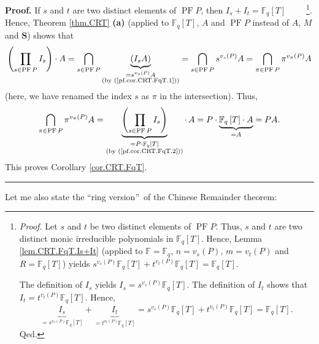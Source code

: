 \documentclass[numbers=enddot,12pt,final,onecolumn,notitlepage]{scrartcl}%
\theoremstyle{definition}
\newenvironment{proof}[1][Proof]{\noindent\textbf{#1.} }{\ \rule{0.5em}{0.5em}}
\let\prodnonlimits\prod
\renewcommand{\prod}{\prodnonlimits\limits}
\begin{document}
\begin{proof}
If $s$ and $t$ are two distinct elements of $\operatorname*{PF}P$, then
$I_{s}+I_{t}=\mathbb{F}_{q}\left[  T\right]  $%
\ \ \ \ \footnote{\textit{Proof.} Let $s$ and $t$ be two distinct elements of
$\operatorname*{PF}P$. Thus, $s$ and $t$ are two distinct monic irreducible
polynomials in $\mathbb{F}_{q}\left[  T\right]  $. Hence, Lemma
\ref{lem.CRT.FqT.Is+It} (applied to $\mathbb{F}=\mathbb{F}_{q}$,
$n=v_{s}\left(  P\right)  $, $m=v_{t}\left(  P\right)  $ and $R=\mathbb{F}%
_{q}\left[  T\right]  $) yields $s^{v_{s}\left(  P\right)  }\mathbb{F}%
_{q}\left[  T\right]  +t^{v_{t}\left(  P\right)  }\mathbb{F}_{q}\left[
T\right]  =\mathbb{F}_{q}\left[  T\right]  $.
\par
The definition of $I_{s}$ yields $I_{s}=s^{v_{s}\left(  P\right)  }%
\mathbb{F}_{q}\left[  T\right]  $. The definition of $I_{t}$ shows that
$I_{t}=t^{v_{t}\left(  P\right)  }\mathbb{F}_{q}\left[  T\right]  $. Hence,%
\[
\underbrace{I_{s}}_{=s^{v_{s}\left(  P\right)  }\mathbb{F}_{q}\left[
T\right]  }+\underbrace{I_{t}}_{=t^{v_{t}\left(  P\right)  }\mathbb{F}%
_{q}\left[  T\right]  }=s^{v_{s}\left(  P\right)  }\mathbb{F}_{q}\left[
T\right]  +t^{v_{t}\left(  P\right)  }\mathbb{F}_{q}\left[  T\right]
=\mathbb{F}_{q}\left[  T\right]  .
\]
Qed.}. Hence, Theorem \ref{thm.CRT} \textbf{(a)} (applied to $\mathbb{F}%
_{q}\left[  T\right]  $, $A$ and $\operatorname*{PF}P$ instead of $A$, $M$ and
$\mathbf{S}$) shows that%
\[
\left(  \prod\limits_{s\in\operatorname*{PF}P}I_{s}\right)  \cdot
A=\bigcap_{s\in\operatorname*{PF}P}\underbrace{\left(  I_{s}A\right)
}_{\substack{=s^{v_{s}\left(  P\right)  }A\\\text{(by (\ref{pf.cor.CRT.FqT.1}%
))}}}=\bigcap_{s\in\operatorname*{PF}P}s^{v_{s}\left(  P\right)  }%
A=\bigcap_{\pi\in\operatorname*{PF}P}\pi^{v_{\pi}\left(  P\right)  }A
\]
(here, we have renamed the index $s$ as $\pi$ in the intersection). Thus,%
\[
\bigcap_{\pi\in\operatorname*{PF}P}\pi^{v_{\pi}\left(  P\right)
}A=\underbrace{\left(  \prod\limits_{s\in\operatorname*{PF}P}I_{s}\right)
}_{\substack{=P\cdot\mathbb{F}_{q}\left[  T\right]  \\\text{(by
(\ref{pf.cor.CRT.FqT.2}))}}}\cdot\,A=P\cdot\underbrace{\mathbb{F}_{q}\left[
T\right]  \cdot A}_{=A}=PA.
\]
This proves Corollary \ref{cor.CRT.FqT}.
\end{proof}

Let me also state the \textquotedblleft ring version\textquotedblright\ of the
Chinese Remainder theorem:
\end{document}
